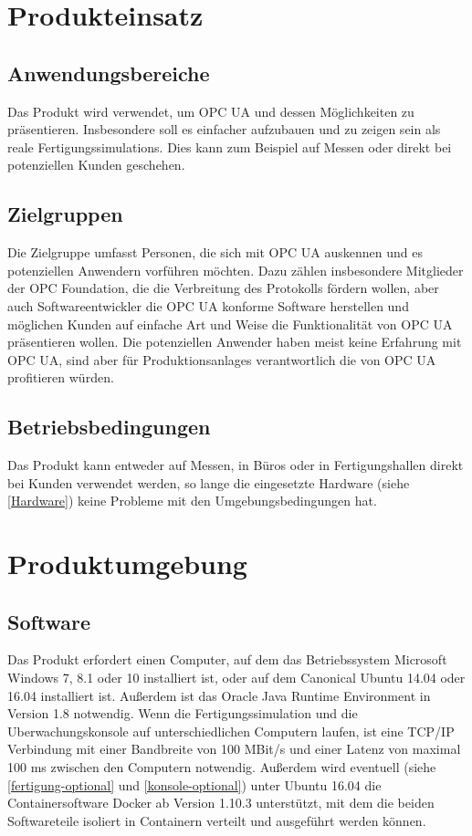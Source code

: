 \documentclass[parskip=full]{scrartcl}
\begin{document}
\newpage
\section{Produkteinsatz}
\subsection{Anwendungsbereiche}
Das Produkt wird verwendet, um \gls{OPC UA} und dessen Möglichkeiten zu präsentieren.
Insbesondere soll es einfacher aufzubauen und zu zeigen sein als reale \glspl{Fertigungssimulation}.
Dies kann zum Beispiel auf Messen oder direkt bei potenziellen Kunden geschehen.
\subsection{Zielgruppen}
Die Zielgruppe umfasst Personen, die sich mit \gls{OPC UA} auskennen und es potenziellen Anwendern vorführen möchten.
Dazu zählen insbesondere Mitglieder der OPC Foundation, die die Verbreitung des Protokolls fördern wollen,
aber auch Softwareentwickler die \gls{OPC UA} konforme Software herstellen und möglichen Kunden auf einfache Art und
Weise die Funktionalität von \gls{OPC UA} präsentieren wollen.
Die potenziellen Anwender haben meist keine Erfahrung mit \gls{OPC UA}, sind aber für \glspl{Produktionsanlage} verantwortlich
die von \gls{OPC UA} profitieren würden.

\subsection{Betriebsbedingungen}
Das Produkt kann entweder auf Messen, in Büros oder in Fertigungshallen direkt bei Kunden verwendet werden,
so lange die eingesetzte Hardware (siehe \ref{Hardware}) keine Probleme mit den Umgebungsbedingungen hat.

\pagebreak
\section{Produktumgebung}
\subsection{Software}
Das Produkt erfordert einen Computer, auf dem das Betriebssystem Microsoft Windows 7, 8.1 oder 10 installiert ist,
oder auf dem Canonical Ubuntu 14.04 oder 16.04 installiert ist. Außerdem ist das Oracle Java Runtime Environment in Version 1.8
notwendig. Wenn die \gls{Fertigungssimulation} und die \gls{Uberwachungskonsole} auf unterschiedlichen Computern laufen,
ist eine \gls{TCP/IP} Verbindung mit einer Bandbreite von 100 MBit/s und einer Latenz von maximal 100 ms zwischen den Computern notwendig.
Außerdem wird eventuell (siehe \ref{fertigung-optional} und \ref{konsole-optional}) unter Ubuntu 16.04 die Containersoftware Docker
ab Version 1.10.3 unterstützt, mit dem die beiden Softwareteile isoliert in Containern verteilt und ausgeführt werden können.
\end{document}
